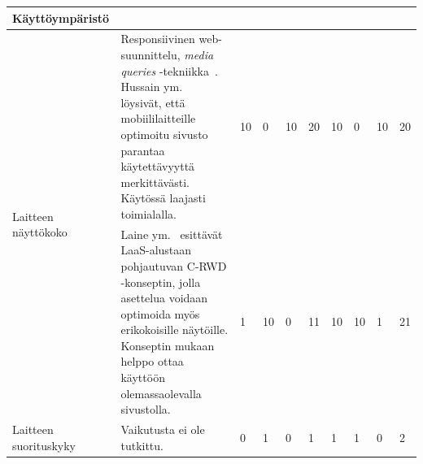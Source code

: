 \documentclass[finnish, 12pt, a4paper, elec, utf8, a-1b, online]{aaltothesis}
\begin{document}
{\begin{longtable}{p{2.5cm}|p{6cm}|p{0.5cm}p{0.5cm}p{0.5cm}|p{0.5cm}|p{0.5cm}p{0.5cm}p{0.5cm}|p{0.5cm}|}
    \midrule
    \textbf{Käyttöympäristö}                                                                                                                                                                                                                                                                                                                                                                                                                                                                                                                                                                                                                                                                                                                              \\
    \midrule
    \multirow[t]{2}{*}{Laitteen näyttökoko} & Responsiivinen web-suunnittelu, \textit{media queries} -tekniikka~\cite{Rivoal:12:MQ}. Hussain ym.~\cite{WOS:000218608600006} löysivät, että mobiililaitteille optimoitu sivusto parantaa käytettävyyttä merkittävästi. Käytössä laajasti toimialalla.                                                                                                                  & 10                                         & 0                                   & 10                                     & 20                           & 10                                              & 0                                         & 10                                        & 20                           \\\cline{2-10}
                                            & Laine ym.~\cite{laine2021responsive} esittävät LaaS-alustaan pohjautuvan C-RWD -konseptin, jolla asettelua voidaan optimoida myös erikokoisille näytöille. Konseptin mukaan helppo ottaa käyttöön olemassaolevalla sivustolla.                                                                                                                                          & 1                                          & 10                                  & 0                                      & 11                           & 10                                              & 10                                        & 1                                         & 21                           \\
    \midrule
    Laitteen suorituskyky                   & Vaikutusta ei ole tutkittu.                                                                                                                                                                                                                                                                                                                                             & 0                                          & 1                                   & 0                                      & 1                            & 1                                               & 1                                         & 0                                         & 2                            \\

\end{longtable}}
\end{document}
